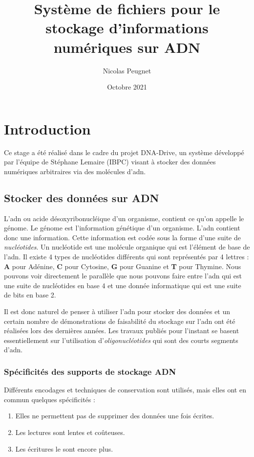 \documentclass[a4paper]{report}
\title{Système de fichiers pour le stockage d’informations numériques sur ADN}
\date{Octobre 2021}
\author{Nicolas Peugnet}
\begin{document}
\maketitle

\tableofcontents

\chapter{Introduction}

Ce stage a été réalisé dans le cadre du projet DNA-Drive, un système développé par l'équipe de Stéphane Lemaire (IBPC) visant à stocker des données numériques arbitraires via des molécules d'\ac{adn}.

\section{Stocker des données sur ADN}

L’\ac{adn} ou acide désoxyribonucléique d’un organisme, contient ce qu’on appelle le génome.
Le génome est l’information génétique d’un organisme. L’\ac{adn} contient donc une information.
Cette information est codée sous la forme d’une suite de \emph{nucléotides}.
Un nucléotide est une molécule organique qui est l’élément de base de l’\ac{adn}.
Il existe 4 types de nucléotides différents qui sont représentés par 4 lettres : \textbf{A} pour Adénine, \textbf{C} pour Cytosine, \textbf{G} pour Guanine et \textbf{T} pour Thymine.
Nous pouvons voir directement le parallèle que nous pouvons faire entre l’\ac{adn} qui est une suite de nucléotides en base 4 et une donnée informatique qui est une suite de bits en base 2.

Il est donc naturel de penser à utiliser l’\ac{adn} pour stocker des données
et un certain nombre de démonstrations de faisabilité du stockage sur l’\ac{adn} ont été réalisées lors des dernières années.
Les travaux publiés pour l’instant se basent essentiellement sur l’utilisation d’\emph{oligonucléotides} qui sont des courts segments d’\ac{adn}.


\subsection{Spécificités des supports de stockage ADN}

Différents encodages et techniques de conservation sont utilisés, mais elles ont en commun quelques spécificités :

\begin{enumerate}
  \item Elles ne permettent pas de supprimer des données une fois écrites.
  \item Les lectures sont lentes et coûteuses.
  \item Les écritures le sont encore plus.
\end{enumerate}
\end{document}
